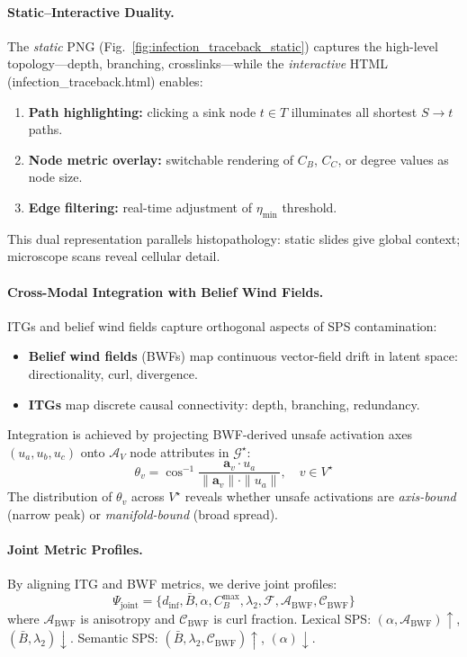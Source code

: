 \documentclass[11pt]{article}
\begin{document}
\paragraph{Static–Interactive Duality.}
The \emph{static} PNG (Fig.~\ref{fig:infection_traceback_static}) captures the high-level topology—depth, branching, crosslinks—while the \emph{interactive} HTML (infection\_traceback.html) enables:
\begin{enumerate}
    \item \textbf{Path highlighting:} clicking a sink node $t \in T$ illuminates all shortest $S \to t$ paths.
    \item \textbf{Node metric overlay:} switchable rendering of $C_B$, $C_C$, or degree values as node size.
    \item \textbf{Edge filtering:} real-time adjustment of $\eta_{\min}$ threshold.
\end{enumerate}
This dual representation parallels histopathology: static slides give global context; microscope scans reveal cellular detail.

\paragraph{Cross-Modal Integration with Belief Wind Fields.}
ITGs and belief wind fields capture orthogonal aspects of SPS contamination:
\begin{itemize}
    \item \textbf{Belief wind fields} (BWFs) map continuous vector-field drift in latent space: directionality, curl, divergence.
    \item \textbf{ITGs} map discrete causal connectivity: depth, branching, redundancy.
\end{itemize}
Integration is achieved by projecting BWF-derived unsafe activation axes $(u_a, u_b, u_c)$ onto $\mathcal{A}_V$ node attributes in $\mathcal{G}^\star$:
\[
\theta_v = \cos^{-1} \frac{\mathbf{a}_v \cdot u_a}{\|\mathbf{a}_v\| \cdot \|u_a\|}, \quad v \in V^\star
\]
The distribution of $\theta_v$ across $V^\star$ reveals whether unsafe activations are \emph{axis-bound} (narrow peak) or \emph{manifold-bound} (broad spread).

\paragraph{Joint Metric Profiles.}
By aligning ITG and BWF metrics, we derive joint profiles:
\[
\Psi_{\mathrm{joint}} = \{ d_{\mathrm{inf}}, \bar{B}, \alpha, C_B^{\max}, \lambda_2, \mathcal{F}, \mathcal{A}_{\mathrm{BWF}}, \mathcal{C}_{\mathrm{BWF}} \}
\]
where $\mathcal{A}_{\mathrm{BWF}}$ is anisotropy and $\mathcal{C}_{\mathrm{BWF}}$ is curl fraction.  
Lexical SPS: $(\alpha, \mathcal{A}_{\mathrm{BWF}}) \uparrow$, $(\bar{B}, \lambda_2) \downarrow$.  
Semantic SPS: $(\bar{B}, \lambda_2, \mathcal{C}_{\mathrm{BWF}}) \uparrow$, $(\alpha) \downarrow$.
\end{document}
